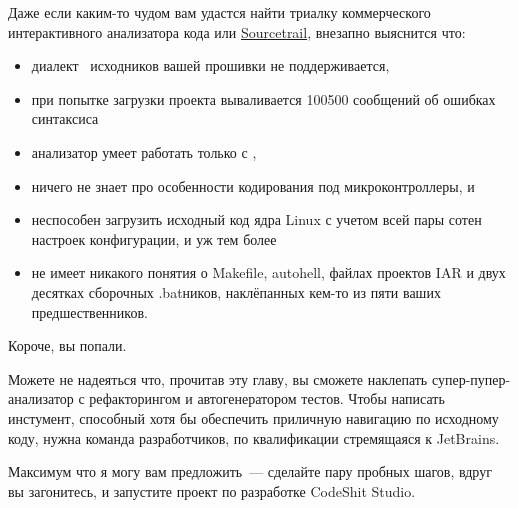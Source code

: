 \label{emcin}

Даже если каким-то чудом вам удастся найти триалку коммерческого интерактивного
анализатора кода или \href{https://www.sourcetrail.com/}{Sourcetrail}, внезапно
выяснится что:
\begin{itemize}[nosep]
  \item диалект \emc\ исходников вашей прошивки не поддерживается,
  \item при попытке загрузки проекта вываливается 100500 сообщений об ошибках
  синтаксиса
  \item анализатор умеет работать только с \cpp,
  \item ничего не знает про особенности кодирования под микроконтроллеры, и
  \item неспособен загрузить исходный код ядра Linux с учетом всей пары сотен
  настроек конфигурации, и уж тем более
  \item не имеет никакого понятия о Makefile, autohell, файлах проектов IAR и
  двух десятках сборочных .batников, наклёпанных кем-то из пяти ваших
  предшественников.
\end{itemize}

\clearpage
Короче, вы попали.
\bigskip

Можете не надеяться что, прочитав эту главу, вы сможете наклепать
супер-пупер-анализатор с рефакторингом и автогенератором тестов. Чтобы написать
инстумент, способный хотя бы обеспечить приличную навигацию по исходному коду,
нужна команда разработчиков, по квалификации стремящаяся к JetBrains.

Максимум что я могу вам предложить\ --- сделайте пару пробных шагов, вдруг вы
загонитесь, и запустите проект по разработке CodeShit Studio.

